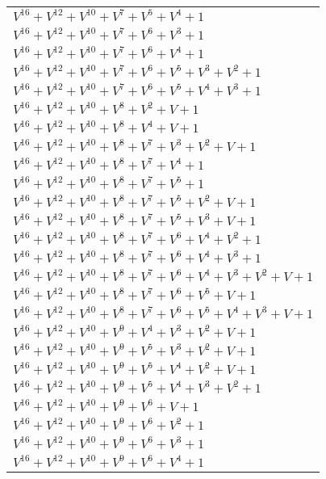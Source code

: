 \documentclass[12pt]{article}
\begin{document}
\begin{adjustwidth}{-4cm}{}
\begin{center}
\begin{longtable}{|l|}
$V^{16}  +V^{12}  +V^{10}  +V^{7}  +V^{5}  +V^{4}  + 1$ \\
$V^{16}  +V^{12}  +V^{10}  +V^{7}  +V^{6}  +V^{3}  + 1$ \\
$V^{16}  +V^{12}  +V^{10}  +V^{7}  +V^{6}  +V^{4}  + 1$ \\
$V^{16}  +V^{12}  +V^{10}  +V^{7}  +V^{6}  +V^{5}  +V^{3}  +V^{2}  + 1$ \\
$V^{16}  +V^{12}  +V^{10}  +V^{7}  +V^{6}  +V^{5}  +V^{4}  +V^{3}  + 1$ \\
$V^{16}  +V^{12}  +V^{10}  +V^{8}  +V^{2}  + V + 1$ \\
$V^{16}  +V^{12}  +V^{10}  +V^{8}  +V^{4}  + V + 1$ \\
$V^{16}  +V^{12}  +V^{10}  +V^{8}  +V^{7}  +V^{3}  +V^{2}  + V + 1$ \\
$V^{16}  +V^{12}  +V^{10}  +V^{8}  +V^{7}  +V^{4}  + 1$ \\
$V^{16}  +V^{12}  +V^{10}  +V^{8}  +V^{7}  +V^{5}  + 1$ \\
$V^{16}  +V^{12}  +V^{10}  +V^{8}  +V^{7}  +V^{5}  +V^{2}  + V + 1$ \\
$V^{16}  +V^{12}  +V^{10}  +V^{8}  +V^{7}  +V^{5}  +V^{3}  + V + 1$ \\
$V^{16}  +V^{12}  +V^{10}  +V^{8}  +V^{7}  +V^{6}  +V^{4}  +V^{2}  + 1$ \\
$V^{16}  +V^{12}  +V^{10}  +V^{8}  +V^{7}  +V^{6}  +V^{4}  +V^{3}  + 1$ \\
$V^{16}  +V^{12}  +V^{10}  +V^{8}  +V^{7}  +V^{6}  +V^{4}  +V^{3}  +V^{2}  + V + 1$ \\
$V^{16}  +V^{12}  +V^{10}  +V^{8}  +V^{7}  +V^{6}  +V^{5}  + V + 1$ \\
$V^{16}  +V^{12}  +V^{10}  +V^{8}  +V^{7}  +V^{6}  +V^{5}  +V^{4}  +V^{3}  + V + 1$ \\
$V^{16}  +V^{12}  +V^{10}  +V^{9}  +V^{4}  +V^{3}  +V^{2}  + V + 1$ \\
$V^{16}  +V^{12}  +V^{10}  +V^{9}  +V^{5}  +V^{3}  +V^{2}  + V + 1$ \\
$V^{16}  +V^{12}  +V^{10}  +V^{9}  +V^{5}  +V^{4}  +V^{2}  + V + 1$ \\
$V^{16}  +V^{12}  +V^{10}  +V^{9}  +V^{5}  +V^{4}  +V^{3}  +V^{2}  + 1$ \\
$V^{16}  +V^{12}  +V^{10}  +V^{9}  +V^{6}  + V + 1$ \\
$V^{16}  +V^{12}  +V^{10}  +V^{9}  +V^{6}  +V^{2}  + 1$ \\
$V^{16}  +V^{12}  +V^{10}  +V^{9}  +V^{6}  +V^{3}  + 1$ \\
$V^{16}  +V^{12}  +V^{10}  +V^{9}  +V^{6}  +V^{4}  + 1$ \\

\end{longtable}
\end{center}
\end{adjustwidth}
\end{document}
